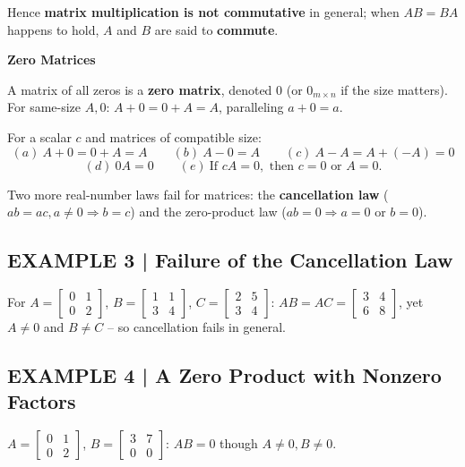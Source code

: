 \documentclass{article}
\newcommand{\redheading}[1]{{\vspace{2mm}\noindent\Large\bfseries\color{red!55!black} #1\par}\vspace{2mm}}
\theoremstyle{mystyle}
\begin{document}
Hence \textbf{matrix multiplication is not commutative} in general; when $AB=BA$ happens to hold, $A$ and $B$ are said to \textbf{commute}.

\redheading{Zero Matrices}

A matrix of all zeros is a \textbf{zero matrix}, denoted $0$ (or $0_{m\times n}$ if the size matters). For same-size $A,0$: $A+0=0+A=A$, paralleling $a+0=a$.

\begin{tcolorbox}[colback=red!4, colframe=red!60!black, title=Theorem 1.4.2 -- Properties of Zero Matrices, boxrule=0.5mm, arc=3mm]
For a scalar $c$ and matrices of compatible size:
\[
(a)\ A+0=0+A=A\qquad (b)\ A-0=A\qquad (c)\ A-A=A+(-A)=0
\]
\[
(d)\ 0A=0\qquad (e)\ \text{If } cA=0,\text{ then } c=0 \text{ or } A=0.
\]
\end{tcolorbox}

Two more real-number laws fail for matrices: the \textbf{cancellation law} ($ab=ac,a\ne0\Rightarrow b=c$) and the zero-product law ($ab=0\Rightarrow a=0$ or $b=0$).

\subsection*{EXAMPLE 3 | Failure of the Cancellation Law}
For $A=\begin{bmatrix}0&1\\0&2\end{bmatrix}$, $B=\begin{bmatrix}1&1\\3&4\end{bmatrix}$, $C=\begin{bmatrix}2&5\\3&4\end{bmatrix}$: $AB=AC=\begin{bmatrix}3&4\\6&8\end{bmatrix}$, yet $A\ne0$ and $B\ne C$ -- so cancellation fails in general.

\subsection*{EXAMPLE 4 | A Zero Product with Nonzero Factors}
$A=\begin{bmatrix}0&1\\0&2\end{bmatrix}$, $B=\begin{bmatrix}3&7\\0&0\end{bmatrix}$: $AB=0$ though $A\ne0,B\ne0$.
\end{document}
